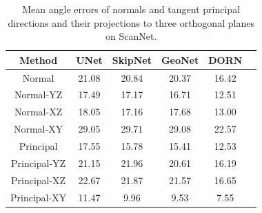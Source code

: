 \begin{table}
    \centering
    \small
    \begin{tabular}{|c|c|c|c|c|c|}
        \hline
         Method & UNet & SkipNet & GeoNet & DORN\\
         \hline
         Normal & 21.08 & 20.84 & 20.37 & 16.42\\
         \hline
         Normal-YZ & 17.49 & 17.17 & 16.71 & 12.51\\
         \hline
         Normal-XZ & 18.05 & 17.16 & 17.68 & 13.00\\
         \hline
         Normal-XY & 29.05 & 29.71 & 29.08 & 22.57\\
         \hline
         Principal & 17.55 & 15.78 & 15.41 & 12.53\\
         \hline
         Principal-YZ & 21.15 & 21.96 & 20.61 & 16.19\\
         \hline
         Principal-XZ & 22.67 & 21.87 & 21.57 & 16.65\\
         \hline
         Principal-XY & 11.47 & 9.96 & 9.53 & 7.55\\
         \hline
    \end{tabular}
    \caption{Mean angle errors of normals and tangent principal directions and their projections to three orthogonal planes on ScanNet.}
    \label{tab:framenet-error}
\end{table}
\label{sec:framenet-ablate}

